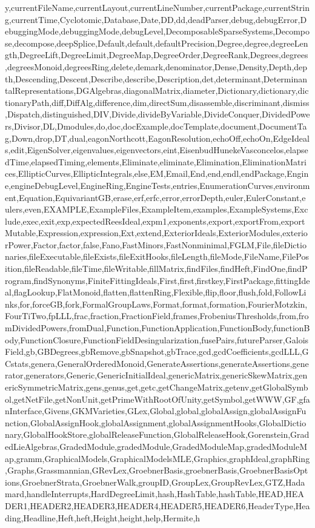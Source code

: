 {y,currentFileName,currentLayout,currentLineNumber,currentPackage,currentString,currentTime,Cyclotomic,Database,Date,DD,dd,deadParser,debug,debugError,DebuggingMode,debuggingMode,debugLevel,DecomposableSparseSystems,Decompose,decompose,deepSplice,Default,default,defaultPrecision,Degree,degree,degreeLength,DegreeLift,DegreeLimit,DegreeMap,DegreeOrder,DegreeRank,Degrees,degrees,degreesMonoid,degreesRing,delete,demark,denominator,Dense,Density,Depth,depth,Descending,Descent,Describe,describe,Description,det,determinant,DeterminantalRepresentations,DGAlgebras,diagonalMatrix,diameter,Dictionary,dictionary,dictionaryPath,diff,DiffAlg,difference,dim,directSum,disassemble,discriminant,dismiss,Dispatch,distinguished,DIV,Divide,divideByVariable,DivideConquer,DividedPowers,Divisor,DL,Dmodules,do,doc,docExample,docTemplate,document,DocumentTag,Down,drop,DT,dual,eagonNorthcott,EagonResolution,echoOff,echoOn,EdgeIdeals,edit,EigenSolver,eigenvalues,eigenvectors,eint,EisenbudHunekeVasconcelos,elapsedTime,elapsedTiming,elements,Eliminate,eliminate,Elimination,EliminationMatrices,EllipticCurves,EllipticIntegrals,else,EM,Email,End,end,endl,endPackage,Engine,engineDebugLevel,EngineRing,EngineTests,entries,EnumerationCurves,environment,Equation,EquivariantGB,erase,erf,erfc,error,errorDepth,euler,EulerConstant,eulers,even,EXAMPLE,ExampleFiles,ExampleItem,examples,ExampleSystems,Exclude,exec,exit,exp,expectedReesIdeal,expm1,exponents,export,exportFrom,exportMutable,Expression,expression,Ext,extend,ExteriorIdeals,ExteriorModules,exteriorPower,Factor,factor,false,Fano,FastMinors,FastNonminimal,FGLM,File,fileDictionaries,fileExecutable,fileExists,fileExitHooks,fileLength,fileMode,FileName,FilePosition,fileReadable,fileTime,fileWritable,fillMatrix,findFiles,findHeft,FindOne,findProgram,findSynonyms,FiniteFittingIdeals,First,first,firstkey,FirstPackage,fittingIdeal,flagLookup,FlatMonoid,flatten,flattenRing,Flexible,flip,floor,flush,fold,FollowLinks,for,forceGB,fork,FormalGroupLaws,Format,format,formation,FourierMotzkin,FourTiTwo,fpLLL,frac,fraction,FractionField,frames,FrobeniusThresholds,from,fromDividedPowers,fromDual,Function,FunctionApplication,FunctionBody,functionBody,FunctionClosure,FunctionFieldDesingularization,fusePairs,futureParser,GaloisField,gb,GBDegrees,gbRemove,gbSnapshot,gbTrace,gcd,gcdCoefficients,gcdLLL,GCstats,genera,GeneralOrderedMonoid,GenerateAssertions,generateAssertions,generator,generators,Generic,GenericInitialIdeal,genericMatrix,genericSkewMatrix,genericSymmetricMatrix,gens,genus,get,getc,getChangeMatrix,getenv,getGlobalSymbol,getNetFile,getNonUnit,getPrimeWithRootOfUnity,getSymbol,getWWW,GF,gfanInterface,Givens,GKMVarieties,GLex,Global,global,globalAssign,globalAssignFunction,GlobalAssignHook,globalAssignment,globalAssignmentHooks,GlobalDictionary,GlobalHookStore,globalReleaseFunction,GlobalReleaseHook,Gorenstein,GradedLieAlgebras,GradedModule,gradedModule,GradedModuleMap,gradedModuleMap,gramm,GraphicalModels,GraphicalModelsMLE,Graphics,graphIdeal,graphRing,Graphs,Grassmannian,GRevLex,GroebnerBasis,groebnerBasis,GroebnerBasisOptions,GroebnerStrata,GroebnerWalk,groupID,GroupLex,GroupRevLex,GTZ,Hadamard,handleInterrupts,HardDegreeLimit,hash,HashTable,hashTable,HEAD,HEADER1,HEADER2,HEADER3,HEADER4,HEADER5,HEADER6,HeaderType,Heading,Headline,Heft,heft,Height,height,help,Hermite,h}
